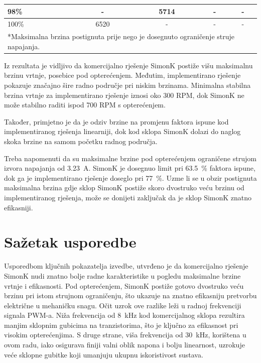 \documentclass[diplomskirad, upload]{fer}
\begin{document}
\begin{table}[h!]
\begin{tabular}{|l|c|c|c|c|}
		98\%                   & -                                           & \num{5714}                                               & -               & -                       \\ \hline
		100\%                  & \num{6520}                                  & -                                                        & -               & -                       \\ \hline
		\multicolumn{5}{l}{\footnotesize{*Maksimalna brzina postignuta prije nego je dosegnuto ograničenje struje napajanja.}}
	\end{tabular}
\end{table}

Iz rezultata je vidljivo da komercijalno rješenje SimonK postiže višu
maksimalnu brzinu vrtnje, posebice pod opterećenjem. Međutim, implementirano
rješenje pokazuje značajno šire radno područje pri niskim brzinama. Minimalna
stabilna brzina vrtnje za implementirano rješenje iznosi oko 300 RPM, dok
SimonK ne može stabilno raditi ispod 700 RPM s opterećenjem.

Također, primjetno je da je odziv brzine na promjenu faktora ispune kod
implementiranog rješenja linearniji, dok kod sklopa SimonK dolazi do naglog
skoka brzine na samom početku radnog područja.

Treba napomenuti da su maksimalne brzine pod opterećenjem ograničene strujom
izvora napajanja od \SI{3.23}{\ampere}. SimonK je dosegnuo limit pri
\SI{63.5}{\%} faktora ispune, dok ga je implementirano rješenje doseglo pri
\SI{77}{\%}. Uzme li se u obzir postignuta maksimalna brzina gdje sklop SimonK
postiže skoro dvostruko veću brzinu od implementiranog rješenja, može se
donijeti zaključak da je sklop SimonK znatno efikasniji.

\section{Sažetak usporedbe}

\label{sec:sazetak_usporedbe}

Usporedbom ključnih pokazatelja izvedbe, utvrđeno je da komercijalno rješenje
SimonK nudi znatno bolje radne karakteristike u pogledu maksimalne brzine
vrtnje i efikasnosti. Pod opterećenjem, SimonK postiže gotovo dvostruko veću
brzinu pri istom strujnom ograničenju, što ukazuje na znatno efikasniju
pretvorbu električne u mehaničku snagu. Očit uzrok ove razlike leži u radnoj
frekvenciji signala PWM-a. Niža frekvencija od \SI{8}{\kilo\hertz} kod
komercijalnog sklopa rezultira manjim sklopnim gubicima na tranzistorima, što
je ključno za efikasnost pri visokim opterećenjima. S druge strane, viša
frekvencija od \SI{30}{\kilo\hertz}, korištena u ovom radu, iako osigurava
finiji valni oblik napona i bolju linearnost, uzrokuje veće sklopne gubitke
koji umanjuju ukupnu iskoristivost sustava.
\end{document}
